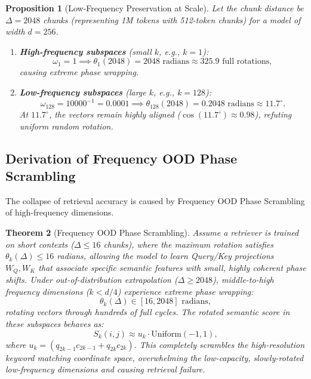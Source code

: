 \documentclass[11pt]{article}
\newtheorem{theorem}{Theorem}[section]
\newtheorem{proposition}[theorem]{Proposition}
\begin{document}
\begin{proposition}[Low-Frequency Preservation at Scale]
Let the chunk distance be $\Delta = 2048$ chunks (representing 1M tokens with 512-token chunks) for a model of width $d = 256$.
\begin{enumerate}
    \item \textbf{High-frequency subspaces} (small $k$, e.g., $k = 1$):
    \begin{equation}
    \omega_1 = 1 \implies \theta_1(2048) = 2048 \text{ radians} \approx 325.9 \text{ full rotations},
    \end{equation}
    causing extreme phase wrapping.
    \item \textbf{Low-frequency subspaces} (large $k$, e.g., $k = 128$):
    \begin{equation}
    \omega_{128} = 10000^{-1} = 0.0001 \implies \theta_{128}(2048) = 0.2048 \text{ radians} \approx 11.7^\circ.
    \end{equation}
    At $11.7^\circ$, the vectors remain highly aligned ($\cos(11.7^\circ) \approx 0.98$), refuting uniform random rotation.
\end{enumerate}
\end{proposition}

\subsection{Derivation of Frequency OOD Phase Scrambling}

The collapse of retrieval accuracy is caused by Frequency OOD Phase Scrambling of high-frequency dimensions.

\begin{theorem}[Frequency OOD Phase Scrambling]
Assume a retriever is trained on short contexts ($\Delta \leq 16$ chunks), where the maximum rotation satisfies $\theta_k(\Delta) \leq 16$ radians, allowing the model to learn Query/Key projections $W_Q, W_K$ that associate specific semantic features with small, highly coherent phase shifts. Under out-of-distribution extrapolation ($\Delta \geq 2048$), middle-to-high frequency dimensions ($k < d/4$) experience extreme phase wrapping:
\begin{equation}
\theta_k(\Delta) \in [16, 2048] \text{ radians},
\end{equation}
rotating vectors through hundreds of full cycles. The rotated semantic score in these subspaces behaves as:
\begin{equation}
S_k(i, j) \approx u_k \cdot \text{Uniform}(-1, 1),
\end{equation}
where $u_k = (q_{2k-1} c_{2k-1} + q_{2k} c_{2k})$. This completely scrambles the high-resolution keyword matching coordinate space, overwhelming the low-capacity, slowly-rotated low-frequency dimensions and causing retrieval failure.
\end{theorem}
\end{document}
